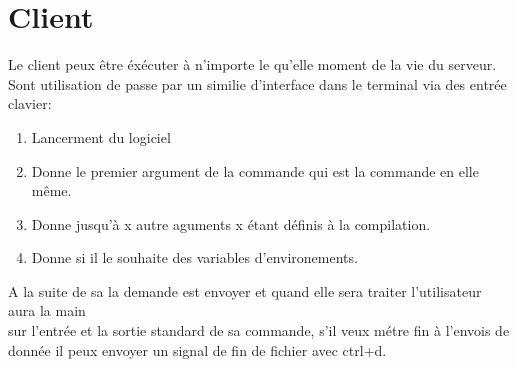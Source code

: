 \documentclass[12pt]{article}
\begin{document}
\section{Client}
    Le client peux être éxécuter à n'importe le qu'elle moment de la vie du serveur.
    Sont utilisation de passe par un similie d'interface dans le terminal via des entrée clavier:
      \begin{enumerate}
        \item Lancerment du logiciel
        \item Donne le premier argument de la commande qui est la commande en elle même.
        \item Donne jusqu'à x autre aguments x étant définis à la compilation.
        \item Donne si il le souhaite des variables d'environements.
      \end{enumerate}
    A la suite de sa la demande est envoyer et quand elle sera traiter l'utilisateur aura la main\\
    sur l'entrée et la sortie standard de sa commande, s'il veux métre fin à l'envois de donnée il peux envoyer
    un signal de fin de fichier avec ctrl+d.
\end{document}
